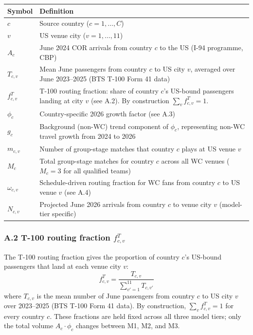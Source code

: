 \documentclass[12pt, a4paper]{article}
\begin{document}
\begin{center}
\small
\begin{tabular}{p{2.2cm} p{10cm}}
\toprule
\textbf{Symbol} & \textbf{Definition} \\
\midrule
$c$ & Source country ($c = 1,\ldots,C$) \\
$v$ & US venue city ($v = 1,\ldots,11$) \\
$A_c$ & June 2024 COR arrivals from country $c$ to the US
        (I-94 programme, CBP) \\
$T_{c,v}$ & Mean June passengers from country $c$ to US city $v$,
        averaged over June 2023--2025 (BTS T-100 Form 41 data) \\
$f_{c,v}^{T}$ & T-100 routing fraction: share of country $c$'s
        US-bound passengers landing at city $v$ (see A.2).
        By construction $\sum_{v} f_{c,v}^{T} = 1$. \\
$\phi_c$ & Country-specific 2026 growth factor (see A.3) \\
$g_c$ & Background (non-WC) trend component of $\phi_c$,
        representing non-WC travel growth from 2024 to 2026 \\
$m_{c,v}$ & Number of group-stage matches that country $c$
        plays at US venue $v$ \\
$M_c$ & Total group-stage matches for country $c$ across all WC venues ($M_c = 3$ for all qualified teams) \\
$\omega_{c,v}$ & Schedule-driven routing fraction for WC fans
        from country $c$ to US venue $v$ (see A.4) \\
$N_{c,v}$ & Projected June 2026 arrivals from country $c$
        to venue city $v$ (model-tier specific) \\
\bottomrule
\end{tabular}
\end{center}

\subsubsection*{A.2 T-100 routing fraction $f_{c,v}^{T}$}

The T-100 routing fraction gives the proportion of country $c$'s
US-bound passengers that land at each venue city $v$:
\[
  f_{c,v}^{T} = \frac{T_{c,v}}{\displaystyle\sum_{v'=1}^{11} T_{c,v'}}
\]
where $T_{c,v}$ is the mean number of June passengers from country
$c$ to US city $v$ over 2023--2025 (BTS T-100 Form 41 data). By
construction, $\sum_{v} f_{c,v}^{T} = 1$ for every country $c$.
These fractions are held fixed across all three model tiers; only
the total volume $A_c \cdot \phi_c$ changes between M1, M2, and M3.
\end{document}
